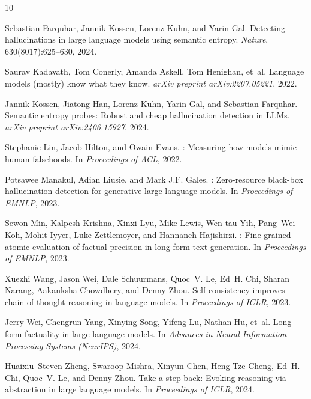 \documentclass{article}
\begin{document}

\begin{thebibliography}{10}

Sebastian Farquhar, Jannik Kossen, Lorenz Kuhn, and Yarin Gal.
\newblock Detecting hallucinations in large language models using semantic entropy.
\newblock \emph{Nature}, 630(8017):625--630, 2024.

Saurav Kadavath, Tom Conerly, Amanda Askell, Tom Henighan, et~al.
\newblock Language models (mostly) know what they know.
\newblock \emph{arXiv preprint arXiv:2207.05221}, 2022.

Jannik Kossen, Jiatong Han, Lorenz Kuhn, Yarin Gal, and Sebastian Farquhar.
\newblock Semantic entropy probes: Robust and cheap hallucination detection in {LLM}s.
\newblock \emph{arXiv preprint arXiv:2406.15927}, 2024.

Stephanie Lin, Jacob Hilton, and Owain Evans.
: Measuring how models mimic human falsehoods.
\newblock In \emph{Proceedings of ACL}, 2022.

Potsawee Manakul, Adian Liusie, and Mark J.F. Gales.
: Zero-resource black-box hallucination detection for generative large language models.
\newblock In \emph{Proceedings of EMNLP}, 2023.

Sewon Min, Kalpesh Krishna, Xinxi Lyu, Mike Lewis, Wen-tau Yih, Pang~Wei Koh, Mohit Iyyer, Luke Zettlemoyer, and Hannaneh Hajishirzi.
: Fine-grained atomic evaluation of factual precision in long form text generation.
\newblock In \emph{Proceedings of EMNLP}, 2023.

Xuezhi Wang, Jason Wei, Dale Schuurmans, Quoc~V. Le, Ed~H. Chi, Sharan Narang, Aakanksha Chowdhery, and Denny Zhou.
\newblock Self-consistency improves chain of thought reasoning in language models.
\newblock In \emph{Proceedings of ICLR}, 2023.

Jerry Wei, Chengrun Yang, Xinying Song, Yifeng Lu, Nathan Hu, et~al.
\newblock Long-form factuality in large language models.
\newblock In \emph{Advances in Neural Information Processing Systems (NeurIPS)}, 2024.

Huaixiu~Steven Zheng, Swaroop Mishra, Xinyun Chen, Heng-Tze Cheng, Ed~H. Chi, Quoc~V. Le, and Denny Zhou.
\newblock Take a step back: Evoking reasoning via abstraction in large language models.
\newblock In \emph{Proceedings of ICLR}, 2024.

\end{thebibliography}
\end{document}
